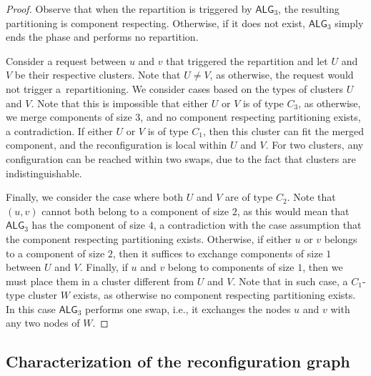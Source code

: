 \documentclass[manuscript,screen=true, review, anonymous]{acmart}
\newcommand{\TAlg}{{\ensuremath{\textsf{ALG}_{3}}}\xspace}
\begin{document}
\begin{proof}
    Observe that when the repartition is triggered by \TAlg, the resulting partitioning is component respecting.
  Otherwise, if it does not exist, \TAlg simply ends the phase and performs no repartition.

  
    Consider a request between $u$ and $v$ that triggered the repartition and let $U$ and $V$ be their respective clusters.
    Note that $U\neq V$,
	 as otherwise, the request would not trigger a~repartitioning.
	 We consider cases based on the types of clusters $U$ and $V$.
    Note that this is impossible that either $U$ or $V$ is of type $C_3$, as otherwise, we merge components of size $3$, and no component respecting partitioning exists, a contradiction.
    If either $U$ or $V$ is of type $C_1$, then this cluster can fit the merged component, and the reconfiguration is local within $U$ and $V$.
    For two clusters, any configuration can be reached within two swaps, due to the fact that clusters are indistinguishable.
  
    Finally, we consider the case where both $U$ and $V$ are of type $C_2$. Note that $(u,v)$ cannot both belong to a component of size $2$, as this would mean that \TAlg has the component of size $4$, a contradiction with the case assumption that the component respecting partitioning exists. 
    Otherwise, if either $u$ or $v$ belongs to a component of size $2$, then it suffices to exchange components of size $1$ between $U$ and $V$.
    Finally, if $u$ and $v$ belong to components of size $1$, then we must place them in a cluster different from $U$ and $V$.
    Note that in such case, a $C_1$-type cluster $W$ exists, as otherwise no component respecting partitioning exists. In this case \TAlg performs one swap, i.e., it exchanges the nodes $u$ and $v$ with any two nodes of $W$.
\end{proof}

\subsection{Characterization of the reconfiguration graph}
\end{document}
